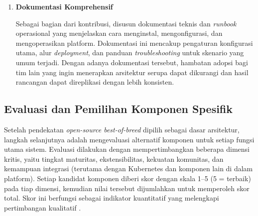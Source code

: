 \begin{enumerate}
    \vspace{0.5em}

    \item \textbf{Dokumentasi Komprehensif}
    
    Sebagai bagian dari kontribusi, disusun dokumentasi teknis dan \textit{runbook} operasional yang menjelaskan cara menginstal, mengonfigurasi, dan mengoperasikan platform. Dokumentasi ini mencakup pengaturan konfigurasi utama, alur \textit{deployment}, dan panduan \textit{troubleshooting} untuk skenario yang umum terjadi. Dengan adanya dokumentasi tersebut, hambatan adopsi bagi tim lain yang ingin menerapkan arsitektur serupa dapat dikurangi dan hasil rancangan dapat direplikasi dengan lebih konsisten.
\end{enumerate}

\subsection{Evaluasi dan Pemilihan Komponen Spesifik}

Setelah pendekatan \textit{open-source best-of-breed} dipilih sebagai dasar arsitektur, langkah selanjutnya adalah mengevaluasi alternatif komponen untuk setiap fungsi utama sistem. Evaluasi dilakukan dengan mempertimbangkan beberapa dimensi kritis, yaitu tingkat maturitas, ekstensibilitas, kekuatan komunitas, dan kemampuan integrasi (terutama dengan Kubernetes dan komponen lain di dalam platform). Setiap kandidat komponen diberi skor dengan skala 1--5 (5 = terbaik) pada tiap dimensi, kemudian nilai tersebut dijumlahkan untuk memperoleh skor total. Skor ini berfungsi sebagai indikator kuantitatif yang melengkapi pertimbangan kualitatif \autocite{triantaphyllou2000multi,keeney1993decisions}.



\vspace{-0.5cm}



\vspace{-0.5cm}



\vspace{-0.5cm}



\vspace{-0.5cm}



